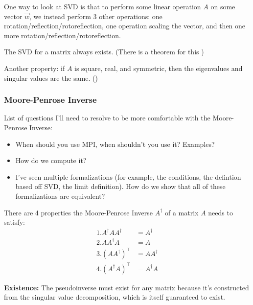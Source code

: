 \documentclass[answers,12pt]{exam}
\begin{document}
One way to look at SVD is that to perform some linear operation $A$ on some vector $\vec{w}$, we instead perform 3 other operations:
one rotation/reflection/rotoreflection, one operation scaling the vector, and then one more rotation/reflection/rotoreflection.

The SVD for a matrix always exists.
(There is a theorem for this )

Another property: if $A$ is square, real, and symmetric, then the eigenvalues and singular values are the same. ()


\subsubsection{Moore-Penrose Inverse}
List of questions I'll need to resolve to be more comfortable with the Moore-Penrose Inverse:
\begin{itemize}
    \item When should you use MPI, when shouldn't you use it?
    Examples?
    \item How do we compute it?
    \item I've seen multiple formalizations (for example, the conditions, the defintion based off SVD, the limit definition).
    How do we show that all of these formalizations are equivalent?
\end{itemize}

There are 4 properties the Moore-Penrose Inverse $A^{\dagger}$ of a matrix $A$ needs to satisfy:
\begin{align*}
    1. A^{\dagger} A A^{\dagger} &= A^{\dagger} \\
    2. A A^{\dagger} A &= A \\
    3. {(A A^{\dagger})}^{\top} &= A A^{\dagger} \\
    4. {(A^{\dagger} A)}^{\top} &= A^{\dagger} A
\end{align*}

\textbf{Existence:} 
The pseudoinverse must exist for any matrix because it's constructed from the singular value decomposition, which is itself guaranteed to exist.
\end{document}
